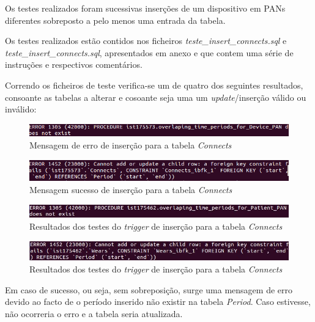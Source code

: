 \documentclass[a4paper]{article}
\begin{document}
\vskip 7mm
Os testes realizados foram sucessivas inserções de um dispositivo em PANs diferentes sobreposto a pelo menos uma entrada da tabela.

Os testes realizados estão contidos nos ficheiros \textit{teste\_insert\_connects.sql} e \textit{teste\_insert\_connects.sql}, apresentados em anexo e que contem uma série de instruções e respectivos comentários.

Correndo os ficheiros de teste verifica-se um de quatro dos seguintes resultados, consoante as tabelas a alterar e cosoante seja uma um \textit{update}/inserção válido ou inválido:

\begin{figure}[ht!]
\centering
\includegraphics[scale=0.7]{erro_connect.png}
\caption{Mensagem de erro de inserção para a tabela \textit{Connects}}
\end{figure}

\begin{figure}[ht!]
\centering
\includegraphics[scale=0.7]{good_connect.png}
\caption{Mensagem sucesso de inserção para a tabela \textit{Connects}}
\end{figure}

\begin{figure}[ht!]
\centering
\includegraphics[scale=0.53]{error_wears.jpg}
\caption{Resultados dos testes do \textit{trigger} de inserção para a tabela \textit{Connects}}
\end{figure}

\begin{figure}[ht!]
\centering
\includegraphics[scale=0.53]{good_wears.jpg}
\caption{Resultados dos testes do \textit{trigger} de inserção para a tabela \textit{Connects}}
\end{figure}

Em caso de sucesso, ou seja, sem sobreposição, surge uma mensagem de erro devido ao facto de o período inserido não existir na tabela \textit{Period}. Caso estivesse, não ocorreria o erro e a tabela seria atualizada.
\pagebreak
\end{document}
